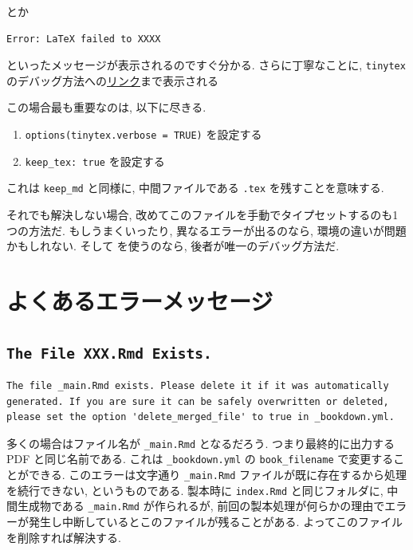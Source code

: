\documentclass[
]{bxjsbook}
\providecommand{\tightlist}{%
  \setlength{\itemsep}{0pt}\setlength{\parskip}{0pt}}
\theoremstyle{definition}
\theoremstyle{definition}
\theoremstyle{definition}
\theoremstyle{remark}
\begin{document}
とか

\begin{verbatim}
Error: LaTeX failed to XXXX
\end{verbatim}

といったメッセージが表示されるのですぐ分かる. さらに丁寧なことに,
\texttt{tinytex}
のデバッグ方法への\href{https://yihui.org/tinytex/r/\#debugging}{リンク}まで表示される

この場合最も重要なのは, 以下に尽きる.

\begin{enumerate}
\def\labelenumi{\arabic{enumi}.}
\tightlist
\item
  \texttt{options(tinytex.verbose\ =\ TRUE)} を設定する
\item
  \texttt{keep\_tex:\ true} を設定する
\end{enumerate}

これは \texttt{keep\_md} と同様に, 中間ファイルである \texttt{.tex}
を残すことを意味する.

それでも解決しない場合,
改めてこのファイルを手動でタイプセットするのも1つの方法だ.
もしうまくいったり, 異なるエラーが出るのなら,
環境の違いが問題かもしれない. そして \upBibTeX を使うのなら,
後者が唯一のデバッグ方法だ.

\hypertarget{ux3088ux304fux3042ux308bux30a8ux30e9ux30fcux30e1ux30c3ux30bbux30fcux30b8}{%
\section{よくあるエラーメッセージ}\label{ux3088ux304fux3042ux308bux30a8ux30e9ux30fcux30e1ux30c3ux30bbux30fcux30b8}}

\hypertarget{the-file-xxx.rmd-exists.}{%
\subsection{\texorpdfstring{\texttt{The\ File\ XXX.Rmd\ Exists.}}{The File XXX.Rmd Exists.}}\label{the-file-xxx.rmd-exists.}}

\begin{verbatim}
The file _main.Rmd exists. Please delete it if it was automatically generated. If you are sure it can be safely overwritten or deleted, please set the option 'delete_merged_file' to true in _bookdown.yml.
\end{verbatim}

多くの場合はファイル名が \texttt{\_main.Rmd} となるだろう.
つまり最終的に出力する PDF と同じ名前である. これは
\texttt{\_bookdown.yml} の \texttt{book\_filename}
で変更することができる. このエラーは文字通り \texttt{\_main.Rmd}
ファイルが既に存在するから処理を続行できない, というものである. 製本時に
\texttt{index.Rmd} と同じフォルダに, 中間生成物である
\texttt{\_main.Rmd} が作られるが,
前回の製本処理が何らかの理由でエラーが発生し中断しているとこのファイルが残ることがある.
よってこのファイルを削除すれば解決する.
\end{document}
